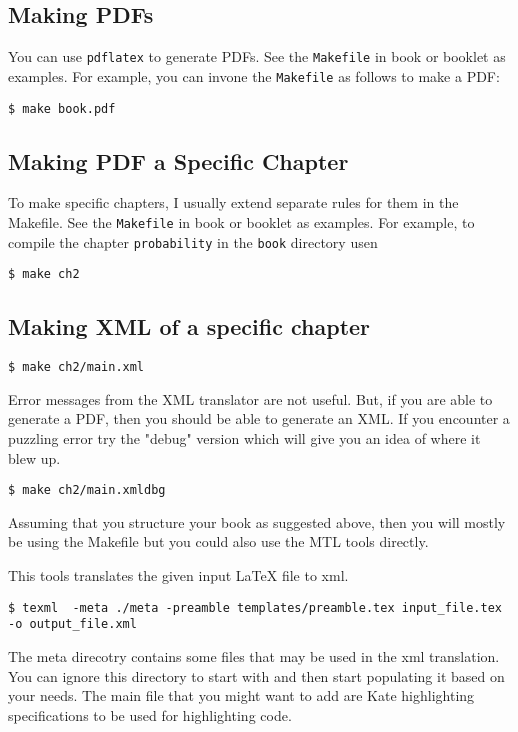 \subsection{Making PDFs}
You can use \lstinline`pdflatex` to generate PDFs.  See the \lstinline`Makefile` in book or booklet as examples.
%
For example, you can  invone the \lstinline`Makefile` as follows to make a PDF:
\begin{lstlisting}
$ make book.pdf
\end{lstlisting}

\subsection{Making PDF a Specific Chapter}
To make specific chapters, I usually extend separate rules for them in the Makefile.  See the \lstinline`Makefile` in book or booklet as examples.
%
For example, to compile the chapter \lstinline`probability` in the \lstinline`book` directory usen
\begin{lstlisting}
$ make ch2
\end{lstlisting}

\subsection{Making XML of a specific chapter}

\begin{lstlisting}
$ make ch2/main.xml
\end{lstlisting}

Error messages from the XML translator are not useful.  But, if you are able to generate a PDF, then you should be able to generate an XML. If you encounter a puzzling error try the "debug" version which will give you an idea of where it blew up.   

\begin{lstlisting}
$ make ch2/main.xmldbg
\end{lstlisting}

Assuming that you structure your book as suggested above, then you will mostly be using the Makefile but you could also use the MTL tools directly. 

\begin{gram}[texml]  
This tools translates the given input LaTeX file to xml.

\begin{lstlisting}
$ texml  -meta ./meta -preamble templates/preamble.tex input_file.tex -o output_file.xml
\end{lstlisting}

The meta direcotry contains some files that may be used in the xml translation.  You can ignore this directory to start with and then start populating it based on your needs.  The main file that you might want to add are Kate highlighting specifications to be used for highlighting code.
\end{gram}

